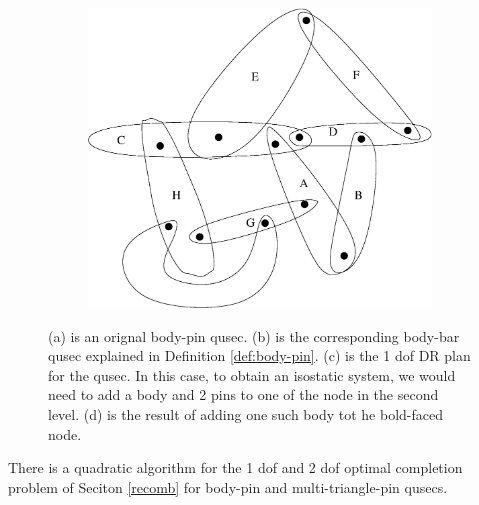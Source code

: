 \begin{figure}
\begin{subfigure}{0.3\linewidth}
\begin{tikzpicture}
    \end{tikzpicture}
    \caption{}
\end{subfigure}
\begin{subfigure}{0.2\linewidth}\centering
    \includegraphics[width=\linewidth]{img/bodypin2}
    \caption{}
\end{subfigure}

    
\caption{(a) is an orignal body-pin qusec. (b) is the corresponding body-bar qusec explained in Definition \ref{def:body-pin}. (c) is the 1 dof DR plan for the qusec. In this case, to obtain an isostatic system, we would need to add a body and 2 pins to one of the node in the second level. (d) is the result of adding one such body tot he bold-faced node.}

\end{figure}

\begin{theorem}
    There is a quadratic algorithm for the 1 dof and 2 dof optimal completion problem of Seciton \ref{recomb} for body-pin and multi-triangle-pin qusecs.
\end{theorem}

